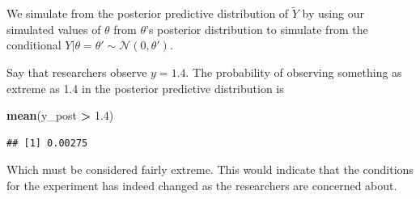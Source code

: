 \documentclass[
]{article}
\newenvironment{Shaded}{\begin{snugshade}}{\end{snugshade}}
\newcommand{\DecValTok}[1]{\textcolor[rgb]{0.00,0.00,0.81}{#1}}
\newcommand{\FloatTok}[1]{\textcolor[rgb]{0.00,0.00,0.81}{#1}}
\newcommand{\FunctionTok}[1]{\textcolor[rgb]{0.13,0.29,0.53}{\textbf{#1}}}
\newcommand{\NormalTok}[1]{#1}
\newcommand{\OtherTok}[1]{\textcolor[rgb]{0.56,0.35,0.01}{#1}}
\newcommand{\SpecialCharTok}[1]{\textcolor[rgb]{0.81,0.36,0.00}{\textbf{#1}}}
\begin{document}
We simulate from the posterior predictive distribution of \(\tilde{Y}\)
by using our simulated values of \(\theta\) from \(\theta\)'s posterior
distribution to simulate from the conditional
\(Y | \theta = \theta' \sim \mathcal{N}(0,\theta')\).

\begin{Shaded}
\end{Shaded}

Say that researchers observe \(y = 1.4\). The probability of observing
something as extreme as 1.4 in the posterior predictive distribution is

\begin{Shaded}
\begin{Highlighting}[]
\FunctionTok{mean}\NormalTok{(y\_post }\SpecialCharTok{\textgreater{}} \FloatTok{1.4}\NormalTok{)}
\end{Highlighting}
\end{Shaded}

\begin{verbatim}
## [1] 0.00275
\end{verbatim}

Which must be considered fairly extreme. This would indicate that the
conditions for the experiment has indeed changed as the researchers are
concerned about.
\end{document}
